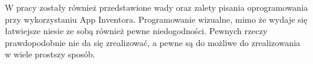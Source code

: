 W pracy zostały również przedstawione wady oraz zalety pisania oprogramowania przy wykorzystaniu App Inventora. Programowanie wizualne, mimo że wydaje się łatwiejsze niesie ze sobą również pewne niedogodności. Pewnych rzeczy prawdopodobnie nie da się zrealizować, a pewne są do możliwe do zrealizowania w wiele prostszy sposób.














